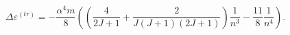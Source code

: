 \begin{equation}
\Delta \varepsilon ^{(tr)}=-\frac{\alpha ^{4}m}{8}\left( \left( \frac{4}{2J+1%
}+\frac{2}{J\left( J+1\right) \left( 2J+1\right) }\right) \frac{1}{n^{3}}-%
\frac{11}{8}\frac{1}{n^{4}}\right) .
\end{equation}

